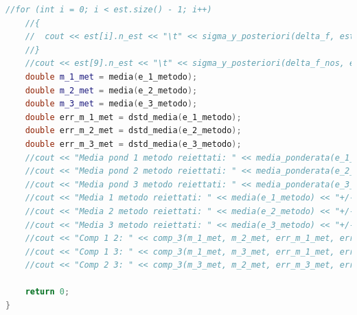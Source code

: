 \documentclass[a4paper,11pt,oneside]{article}
\begin{document}
\begin{lstlisting}[language=C++, label=lst:seconda_parte, caption=seconda\_parte]
	//for (int i = 0; i < est.size() - 1; i++)
	//{
	//	cout << est[i].n_est << "\t" << sigma_y_posteriori(delta_f, est[i].delta_x_all) << "\t" << sigma_y_posteriori(delta_f, est[i].delta_x_acc) << endl;
	//}
	//cout << est[9].n_est << "\t" << sigma_y_posteriori(delta_f_nos, est[9].delta_x_all) << "\t" << sigma_y_posteriori(delta_f_nos, est[9].delta_x_acc) << endl;
	double m_1_met = media(e_1_metodo);
	double m_2_met = media(e_2_metodo);
	double m_3_met = media(e_3_metodo);
	double err_m_1_met = dstd_media(e_1_metodo);
	double err_m_2_met = dstd_media(e_2_metodo);
	double err_m_3_met = dstd_media(e_3_metodo);
	//cout << "Media pond 1 metodo reiettati: " << media_ponderata(e_1_metodo, err_e_1_metodo) << "+/-" << errore_media_ponderata(err_e_1_metodo) << endl;
	//cout << "Media pond 2 metodo reiettati: " << media_ponderata(e_2_metodo, err_e_2_metodo) << "+/-" << errore_media_ponderata(err_e_2_metodo) << endl;
	//cout << "Media pond 3 metodo reiettati: " << media_ponderata(e_3_metodo, err_e_3_metodo) << "+/-" << errore_media_ponderata(err_e_3_metodo) << endl;
	//cout << "Media 1 metodo reiettati: " << media(e_1_metodo) << "+/-" << dstd_media(e_1_metodo) << endl;
	//cout << "Media 2 metodo reiettati: " << media(e_2_metodo) << "+/-" << dstd_media(e_2_metodo) << endl;
	//cout << "Media 3 metodo reiettati: " << media(e_3_metodo) << "+/-" << dstd_media(e_3_metodo) << endl;
	//cout << "Comp 1 2: " << comp_3(m_1_met, m_2_met, err_m_1_met, err_m_2_met) << endl;
	//cout << "Comp 1 3: " << comp_3(m_1_met, m_3_met, err_m_1_met, err_m_3_met) << endl;
	//cout << "Comp 2 3: " << comp_3(m_3_met, m_2_met, err_m_3_met, err_m_2_met) << endl;
	
	return 0;
}
\end{lstlisting}
\end{document}
